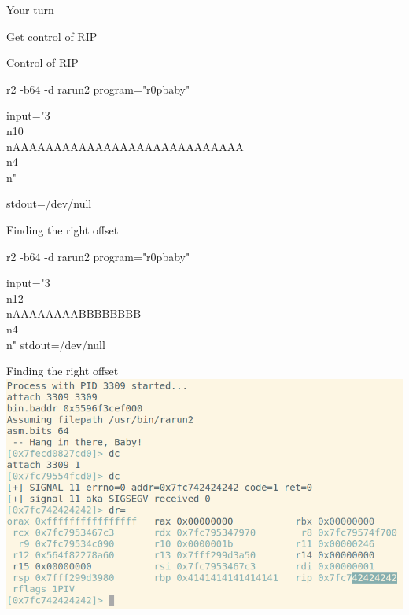 \documentclass{beamer}
\begin{document}
\begin{frame}{Your turn}
    \begin{center}
        \Large Get control of RIP
    \end{center}
\end{frame}

\begin{frame}{Control of RIP}
    \begin{semiverbatim}
    r2 -b64 -d rarun2 program="r0pbaby"

    input="3\\n10\\nAAAAAAAAAAAAAAAAAAAAAAAAAAAA\\n4\\n"

    stdout=/dev/null
\end{semiverbatim}
\end{frame}

\begin{frame}{Finding the right offset}
    \begin{semiverbatim}
    r2 -b64 -d rarun2 program="r0pbaby"

    input="3\\n12\\nAAAAAAAABBBBBBBB\\n4\\n" stdout=/dev/null
\end{semiverbatim}
\end{frame}

\begin{frame}{Finding the right offset}
    \includegraphics[width=\textwidth]{r0pbaby_rip.png}
\end{frame}

\end{document}
